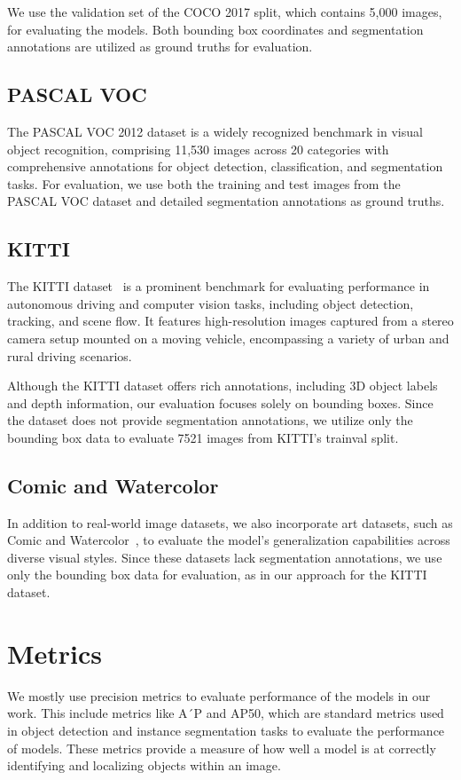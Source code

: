 We use the validation set of the COCO 2017 split, which contains 5,000 images, for evaluating the models. Both bounding box coordinates and segmentation annotations are utilized as ground truths for evaluation.

\subsection{PASCAL VOC}
The PASCAL VOC 2012 dataset is a widely recognized benchmark in visual object recognition, comprising 11,530 images across 20 categories with comprehensive annotations for object detection, classification, and segmentation tasks. For evaluation, we use both the training and test images from the PASCAL VOC dataset and detailed segmentation annotations as ground truths.

\subsection{KITTI}
The KITTI dataset~\cite{Geiger2013IJRR} is a prominent benchmark for evaluating performance in autonomous driving and computer vision tasks, including object detection, tracking, and scene flow. It features high-resolution images captured from a stereo camera setup mounted on a moving vehicle, encompassing a variety of urban and rural driving scenarios. 

Although the KITTI dataset offers rich annotations, including 3D object labels and depth information, our evaluation focuses solely on bounding boxes. Since the dataset does not provide segmentation annotations, we utilize only the bounding box data to evaluate 7521 images from KITTI’s trainval split.

\subsection{Comic and Watercolor}
In addition to real-world image datasets, we also incorporate art datasets, such as Comic and Watercolor~\cite{Inoue_2018_CVPR}, to evaluate the model's generalization capabilities across diverse visual styles. Since these datasets lack segmentation annotations, we use only the bounding box data for evaluation, as in our approach for the KITTI dataset. 

\section{Metrics}
We mostly use precision metrics to evaluate performance of the models in our work. This include metrics like A´P and AP50, which are standard metrics used in object detection and instance segmentation tasks to evaluate the performance of models. These metrics provide a measure of how well a model is at correctly identifying and localizing objects within an image.

